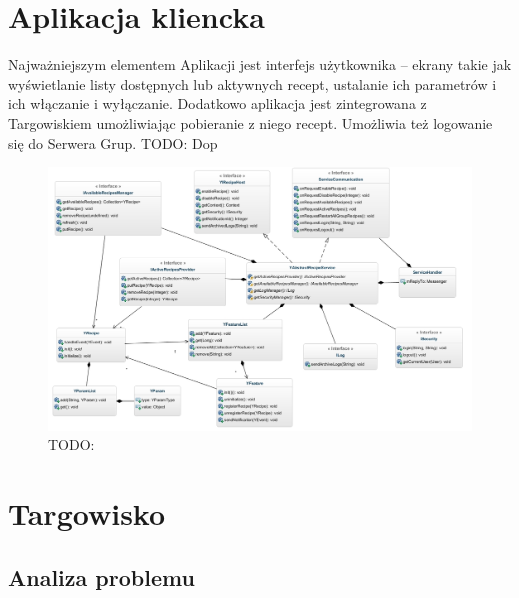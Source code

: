 \documentclass[11pt,a4paper,polish,thesis]{dcsbook}
\begin{document}
\section{Aplikacja kliencka}
Najważniejszym elementem Aplikacji jest interfejs użytkownika -- ekrany takie jak wyświetlanie listy dostępnych lub aktywnych recept, ustalanie ich parametrów i ich włączanie i wyłączanie. Dodatkowo aplikacja jest zintegrowana z Targowiskiem umożliwiając pobieranie z niego recept. Umożliwia też logowanie się do Serwera Grup.
TODO: Dop
\begin{figure}[p]
  \centering
  \includegraphics[scale=0.55]{./resources/service_uml.png}
  \caption{TODO:}
  \label{fig:service_uml}
\end{figure}
\section{Targowisko}            %
\subsection{Analiza problemu}
\end{document}
